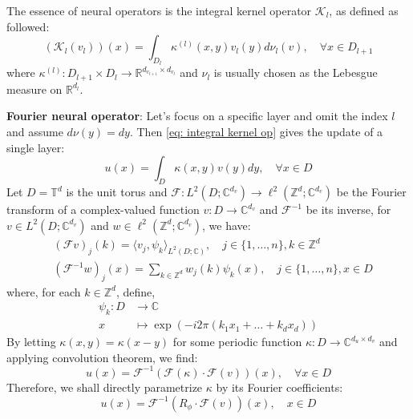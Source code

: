\documentclass{article}
\begin{document}
The essence of neural operators is the integral kernel operator $\mathcal{K}_l$, as defined as followed:
\begin{equation} \label{eq: integral kernel op}
    (\mathcal{K}_l(v_l))(x) = \int_{D_l}\kappa^{(l)}(x, y)v_l(y)d\nu_l(v),\quad \forall x\in D_{l+1}
\end{equation}
where $\kappa^{(l)}:D_{l+1}\times D_{l}\to\mathbb{R}^{d_{v_{l+1}}\times d_{v_l}}$ and $\nu_l$ is usually chosen as the Lebesgue measure on $\mathbb{R}^{d_l}$.

\noindent\textbf{Fourier neural operator}: Let's focus on a specific layer and omit the index $l$ and assume $d\nu(y)=dy$. Then \ref{eq: integral kernel op} gives the update of a single layer:
\begin{equation}
    u(x) = \int_D \kappa(x, y)v(y)dy,\quad \forall x\in D
\end{equation}
Let $D=\mathbb{T}^d$ is the unit torus and $\mathcal{F}:L^2(D;\mathbb{C}^{d_v})\to\ell^2(\mathbb{Z}^d;\mathbb{C}^{d_v})$ be the Fourier transform of a complex-valued function $v:D\to\mathbb{C}^{d_v}$ and $\mathcal{F}^{-1}$ be its inverse, for $v\in L^2(D;\mathbb{C}^{d_v})$ and $w\in\ell^2(\mathbb{Z}^d;\mathbb{C}^{d_v})$, we have:
\begin{align}
    &(\mathcal{F}v)_j(k) = \langle v_j, \psi_k \rangle_{L^2(D;\mathbb{C})},\quad j\in\{1,\dots,n\},k\in\mathbb{Z}^d \label{eq: fwd fourier}
    \\
    &(\mathcal{F}^{-1}w)_j(x) = \sum_{k\in\mathbb{Z}^d}w_j(k)\psi_k(x),\quad j\in\{1,\dots,n\},x\in D \label{eq: bwd fourier}
\end{align}
where, for each $k\in\mathbb{Z}^d$, define,
\begin{align}
    \psi_k: D &\to \mathbb{C} \\
    x &\mapsto\exp(-i2\pi(k_1x_1+\dots+k_dx_d))
\end{align}
By letting $\kappa(x, y) = \kappa(x-y)$ for some periodic function $\kappa: D\to \mathbb{C}^{d_u\times d_v}$ and applying convolution theorem, we find:
\begin{equation}
    u(x) = \mathcal{F}^{-1}(\mathcal{F}(\kappa)\cdot \mathcal{F}(v))(x),\quad \forall x\in D
\end{equation}
Therefore, we shall directly parametrize $\kappa$ by its Fourier coefficients:
\begin{equation} \label{eq: fourier integral}
    u(x) = \mathcal{F}^{-1}(R_\phi\cdot \mathcal{F}(v))(x),\quad x\in D
\end{equation}
\end{document}
